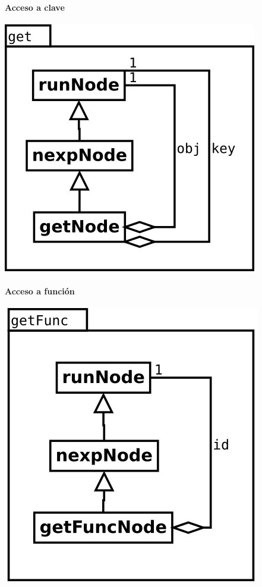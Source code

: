 \paragraph {Acceso a clave} 
\begin{center}
\includegraphics[scale=0.4]{get.png} \\
\end{center}

\paragraph {Acceso a función} 
\begin{center}
\includegraphics[scale=0.4]{getFunc.png} \\
\end{center}


